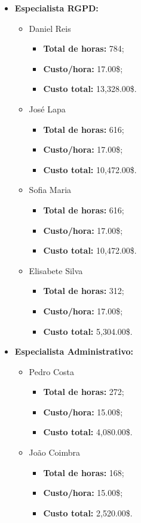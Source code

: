 \begin{itemize}
	\item \textbf{Especialista RGPD:}
		\begin{itemize}
			\item Daniel Reis
				\begin{itemize}
					\item \textbf{Total de horas:} 784;
					\item \textbf{Custo/hora:} 17.00\$;
					\item \textbf{Custo total:} 13,328.00\$.
				\end{itemize}
			\item José Lapa
				\begin{itemize}
					\item \textbf{Total de horas:} 616;
					\item \textbf{Custo/hora:} 17.00\$;
					\item \textbf{Custo total:} 10,472.00\$.
				\end{itemize}
			\item Sofia Maria
				\begin{itemize}
					\item \textbf{Total de horas:} 616;
					\item \textbf{Custo/hora:} 17.00\$;
					\item \textbf{Custo total:} 10,472.00\$.
				\end{itemize}
			\item Elisabete Silva
				\begin{itemize}
					\item \textbf{Total de horas:} 312;
					\item \textbf{Custo/hora:} 17.00\$;
					\item \textbf{Custo total:} 5,304.00\$.
				\end{itemize}
		\end{itemize}

	\item \textbf{Especialista Administrativo:}
		\begin{itemize}
			\item Pedro Costa
				\begin{itemize}
					\item \textbf{Total de horas:} 272;
					\item \textbf{Custo/hora:} 15.00\$;
					\item \textbf{Custo total:} 4,080.00\$.
				\end{itemize}
			\item João Coimbra
				\begin{itemize}
					\item \textbf{Total de horas:} 168;
					\item \textbf{Custo/hora:} 15.00\$;
					\item \textbf{Custo total:} 2,520.00\$.
				\end{itemize}
		\end{itemize}


\end{itemize}
